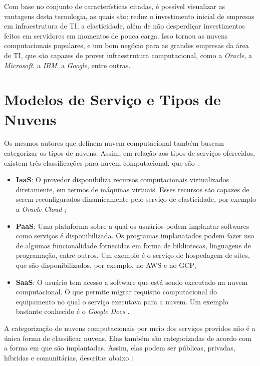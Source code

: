 Com base no conjunto de características citadas, é possível visualizar as vantagens desta tecnologia, as quais são: reduz o investimento inicial de empresas em infraestrutura de TI; a elasticidade, além de não desperdiçar investimentos feitos em servidores em momentos de pouca carga. Isso tornou as nuvens computacionais populares, e um bom negócio para as grandes empresas da área de \acrfull{TI}, que são capazes de prover infraestrutura computacional, como a \textit{Oracle}, a \textit{Microsoft}, a \textit{IBM}, a \textit{Google}, entre outras.

\section{Modelos de Serviço e Tipos de Nuvens}

Os mesmos autores que definem nuvem computacional também buscam categorizar os tipos de nuvens. Assim, em relação aos tipos de serviços oferecidos, existem três classificações para nuvem computacional, que são \cite{Vaquero:2008:BCT:1496091.1496100_Cloud_definition} \cite{NIST_CLOUD_DEFINITION}:

\begin{itemize}
	\item \textbf{\acrfull{IaaS}}: O provedor disponibiliza recursos computacionais virtualizados diretamente, em termos de máquinas virtuais. Esses recursos são capazes de serem reconfigurados dinamicamente pelo serviço de elasticidade, por exemplo a \textit{Oracle Cloud} \cite{OracleCloud};
	\item \textbf{\acrfull{PaaS}}: Uma plataforma sobre a qual os usuários podem implantar softwares como serviços é disponibilizada. Os programas implanatados podem fazer uso de algumas funcionalidade fornecidas em forma de bibliotecas, linguagens de programação, entre outros. Um exemplo é o serviço de hospedagem de sites\cite{PaaS_Hosting}, que são disponibilizados, por exemplo, no \acrfull{AWS}\cite{AWS_GPU} e no \acrfull{GCP}\cite{Google_Cloud_GPU};
	\item \textbf{\acrfull{SaaS}}: O usuário tem acesso a software que está sendo executado na nuvem computacional. O que permite migrar requisito computacional do equipamento no qual o serviço executava para a nuvem. Um exemplo bastante conhecido é o \textit{Google Docs} \cite{GoogleDocs}.
\end{itemize}

A categorização de nuvens computacionais por meio dos serviços providos não é a única forma de classificar nuvens. Elas também são categorizadas de acordo com a forma em que são implantadas. Assim, elas podem ser públicas, privadas, híbridas e comunitárias, descritas abaixo \cite{NIST_CLOUD_DEFINITION}:

